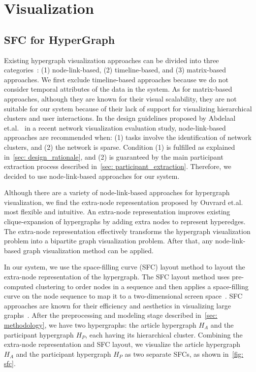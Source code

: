 \section{Visualization}
\subsection{SFC for HyperGraph}
Existing hypergraph visualization approaches can be divided into three categories~\cite{fischer2021hypergraphsurvey}: 
(1) node-link-based, (2) timeline-based, and (3) matrix-based approaches.
We first exclude timeline-based approaches because we do not consider temporal attributes of the data in the system.
As for matrix-based approaches, although they are known for their visual scalability, they are not suitable for our system because of their lack of support for visualizing hierarchical clusters and user interactions.
In the design guidelines proposed by Abdelaal et.al.~\cite{abdelaal2022network} in a recent network visualization evaluation study, node-link-based approaches are recommended when:
(1) tasks involve the identification of network clusters, and (2) the network is sparse.
Condition (1) is fulfilled as explained in~\autoref{sec: design_rationale}, and (2) is guaranteed by the main participant extraction process described in~\autoref{sec: participant_extraction}. 
Therefore, we decided to use node-link-based approaches for our system.

Although there are a variety of node-link-based approaches for hypergraph visualization, we find the extra-node representation proposed by Ouvrard et.al.~\cite{ouvrard2017hypergraph} most flexible and intuitive.
An extra-node representation improves existing clique-expansion of hypergraphs by adding extra nodes to represent hyperedges. 
The extra-node representation effectively transforms the hypergraph visualization problem into a bipartite graph visualization problem.
After that, any node-link-based graph visualization method can be applied.

In our system, we use the space-filling curve (SFC) layout method to layout the extra-node representation of the hypergraph.
The SFC layout method uses pre-computed clustering to order nodes in a sequence and then applies a space-filling curve on the node sequence to map it to a two-dimensional screen space~\cite{muelder2008sfc}.
SFC approaches are known for their efficiency and aesthetics in visualizing large graphs~\cite{ma2013largegraph}.
After the preprocessing and modeling stage described in~\autoref{sec: methodology}, we have two hypergraphs: the article hypergraph $H_A$ and the participant hypergraph $H_P$, each having its hierarchical cluster.
Combining the extra-node representation and SFC layout, we visualize the article hypergraph $H_A$ and the participant hypergraph $H_P$ as two separate SFCs, as shown in~\autoref{fig: sfc}.

